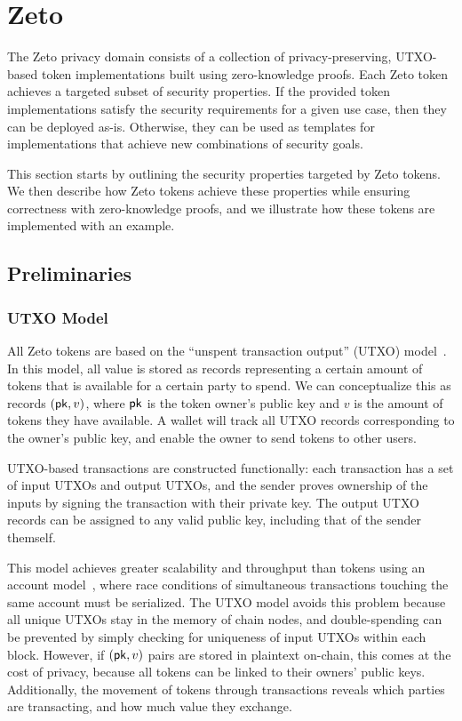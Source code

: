 \section{Zeto}

The Zeto privacy domain consists of a collection of privacy-preserving, UTXO-based token implementations built using zero-knowledge proofs. Each Zeto token achieves a targeted subset of security properties. If the provided token implementations satisfy the security requirements for a given use case, then they can be deployed as-is. Otherwise, they can be used as templates for implementations that achieve new combinations of security goals.

This section starts by outlining the security properties targeted by Zeto tokens. We then describe how Zeto tokens achieve these properties while ensuring correctness with zero-knowledge proofs, and we illustrate how these tokens are implemented with an example.


\subsection{Preliminaries}

\subsubsection{UTXO Model}

All Zeto tokens are based on the ``unspent transaction output'' (UTXO) model~\cite{TODO}. In this model, all value is stored as records representing a certain amount of tokens that is available for a certain party to spend. We can conceptualize this as records $(\mathsf{pk}, v)$, where $\mathsf{pk}$ is the token owner's public key and $v$ is the amount of tokens they have available. A wallet will track all UTXO records corresponding to the owner's public key, and enable the owner to send tokens to other users.

UTXO-based transactions are constructed functionally: each transaction has a set of input UTXOs and output UTXOs, and the sender proves ownership of the inputs by signing the transaction with their private key. The output UTXO records can be assigned to any valid public key, including that of the sender themself.

This model achieves greater scalability and throughput than tokens using an account model~\cite{TODO}, where race conditions of simultaneous transactions touching the same account must be serialized. The UTXO model avoids this problem because all unique UTXOs stay in the memory of chain nodes, and double-spending can be prevented by simply checking for uniqueness of input UTXOs within each block. However, if $(\mathsf{pk}, v)$ pairs are stored in plaintext on-chain, this comes at the cost of privacy, because all tokens can be linked to their owners' public keys. Additionally, the movement of tokens through transactions reveals which parties are transacting, and how much value they exchange.


